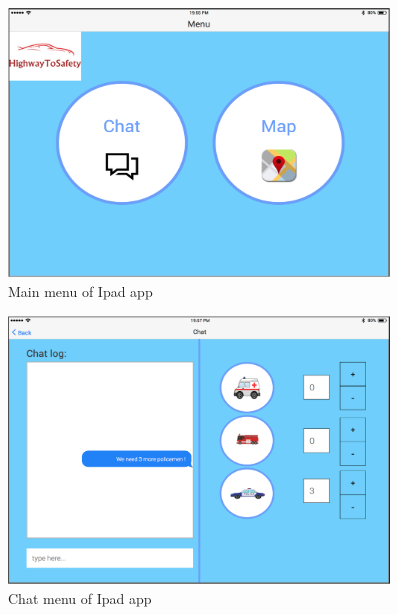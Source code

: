\begin{minipage}{1.0\textwidth}
\begin{figure}[H]
\caption{Main menu of Ipad app}
\includegraphics[width=0.9\textwidth]{Ipad_home.eps}
\end{figure}
\end{minipage}

\begin{minipage}{1.0\textwidth}
\begin{figure}[H]
\caption{Chat menu of Ipad app}
\includegraphics[width=0.9\textwidth]{IpadChatExample.eps}
\end{figure}
\end{minipage}

